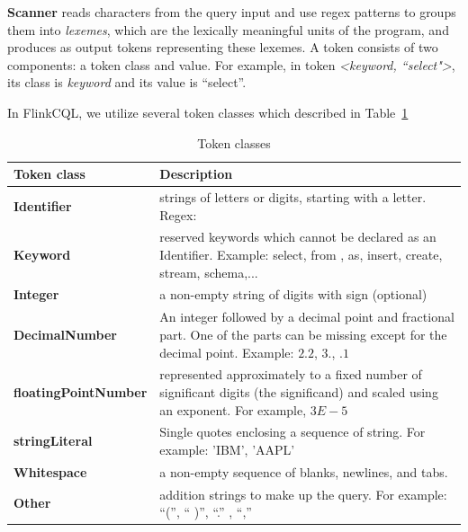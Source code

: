 \textbf{Scanner} reads characters from the query input and use regex patterns to groups them into \textit{lexemes}, which are the lexically meaningful units of the program, and produces as output tokens representing these lexemes. A token consists of two components: a token class and value. For example, in token \textit{<keyword, ``select">}, its class is \textit{keyword} and its value is ``select''. 

In FlinkCQL, we utilize several token classes which described in Table~\ref{table:TokenClass}


\begin{table}[h]
\caption{Token classes}
\centering
\label{table:TokenClass}
\setlength\extrarowheight{5pt}
\begin{tabular}{||>{\centering\bfseries}m{2in}   |>{\centering\arraybackslash}m{3in}||}
\hline
\textbf{Token class} & \textbf{Description} \\ \hline\hline
                 Identifier  & strings of letters or digits, starting with a letter. Regex: 
                                \\ \hline
                   Keyword	  & reserved keywords which cannot be declared as an Identifier. Example: select, from , as, insert, create, stream, schema,... \\ \hline
                   Integer		& a non-empty string of digits with sign (optional) \\ \hline %
				   DecimalNumber		&  An integer followed by a decimal point and fractional part. One of the parts can be missing except for the decimal point. Example: $2.2$, $3.$, $.1$   \\ \hline %
					floatingPointNumber	& represented approximately to a fixed number of significant digits (the significand) and scaled using an exponent. For example, $3E-5$			               \\ \hline		%
					stringLiteral		& Single quotes enclosing a sequence of string. For example: 'IBM', 'AAPL'			 \\ \hline
					Whitespace		& a non-empty sequence of blanks, newlines, and tabs.	 		                      \\ \hline								
					Other	& addition strings to make up the query. For example: ``('', `` )'', ``.'' , {``,'' }		                     \\ \hline							           							           							           							           
\end{tabular}
\end{table}

